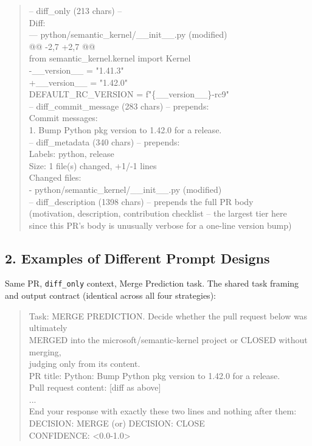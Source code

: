 \documentclass{experimentreport}
\begin{document}
{\begin{quote}
\ttfamily\footnotesize\noindent
-- diff\_only (213 chars) --\\
Diff:\\
--- python/semantic\_kernel/\_\_init\_\_.py (modified)\\
@@ -2,7 +2,7 @@\\
\hspace*{0.5em} from semantic\_kernel.kernel import Kernel\\
-\_\_version\_\_ = "1.41.3"\\
+\_\_version\_\_ = "1.42.0"\\
\hspace*{0.5em} DEFAULT\_RC\_VERSION = f"\{\_\_version\_\_\}-rc9"\\[0.4em]
-- diff\_commit\_message (283 chars) -- prepends:\\
Commit messages:\\
1. Bump Python pkg version to 1.42.0 for a release.\\[0.4em]
-- diff\_metadata (340 chars) -- prepends:\\
Labels: python, release\\
Size: 1 file(s) changed, +1/-1 lines\\
Changed files:\\
\hspace*{1.0em}  - python/semantic\_kernel/\_\_init\_\_.py (modified)\\[0.4em]
-- diff\_description (1398 chars) -- prepends the full PR body\\
(motivation, description, contribution checklist -- the largest tier here\\
since this PR's body is unusually verbose for a one-line version bump)
\end{quote}

\subsection*{2. Examples of Different Prompt Designs}

Same PR, \texttt{diff\_only} context, Merge Prediction task. The shared task framing and output
contract (identical across all four strategies):

\begin{quote}
\ttfamily\footnotesize\noindent
Task: MERGE PREDICTION. Decide whether the pull request below was ultimately\\
MERGED into the microsoft/semantic-kernel project or CLOSED without merging,\\
judging only from its content.\\
PR title: Python: Bump Python pkg version to 1.42.0 for a release.\\
Pull request content: [diff as above]\\
...\\
End your response with exactly these two lines and nothing after them:\\
DECISION: MERGE  (or)  DECISION: CLOSE\\
CONFIDENCE: <0.0-1.0>
\end{quote}

}
\end{document}
